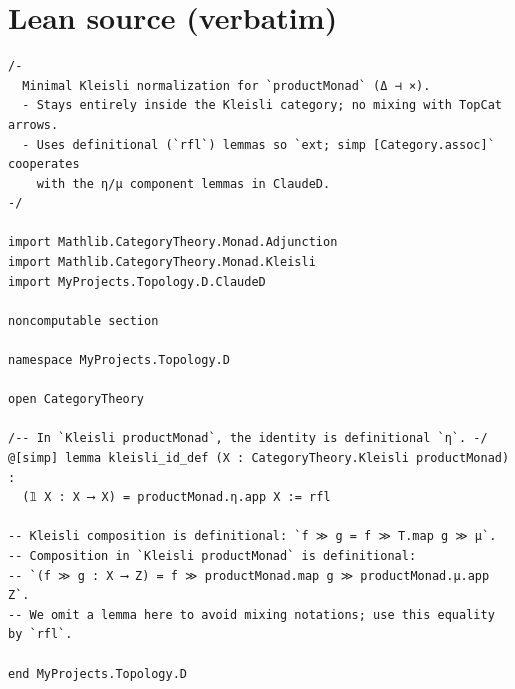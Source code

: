 \documentclass[12pt]{article}
\begin{document}
\section*{Lean source (verbatim)}
\begin{lstlisting}
/-
  Minimal Kleisli normalization for `productMonad` (Δ ⊣ ×).
  - Stays entirely inside the Kleisli category; no mixing with TopCat arrows.
  - Uses definitional (`rfl`) lemmas so `ext; simp [Category.assoc]` cooperates
    with the η/μ component lemmas in ClaudeD.
-/

import Mathlib.CategoryTheory.Monad.Adjunction
import Mathlib.CategoryTheory.Monad.Kleisli
import MyProjects.Topology.D.ClaudeD

noncomputable section

namespace MyProjects.Topology.D

open CategoryTheory

/-- In `Kleisli productMonad`, the identity is definitional `η`. -/
@[simp] lemma kleisli_id_def (X : CategoryTheory.Kleisli productMonad) :
  (𝟙 X : X ⟶ X) = productMonad.η.app X := rfl

-- Kleisli composition is definitional: `f ≫ g = f ≫ T.map g ≫ μ`.
-- Composition in `Kleisli productMonad` is definitional:
-- `(f ≫ g : X ⟶ Z) = f ≫ productMonad.map g ≫ productMonad.μ.app Z`.
-- We omit a lemma here to avoid mixing notations; use this equality by `rfl`.

end MyProjects.Topology.D

\end{lstlisting}
\end{document}
